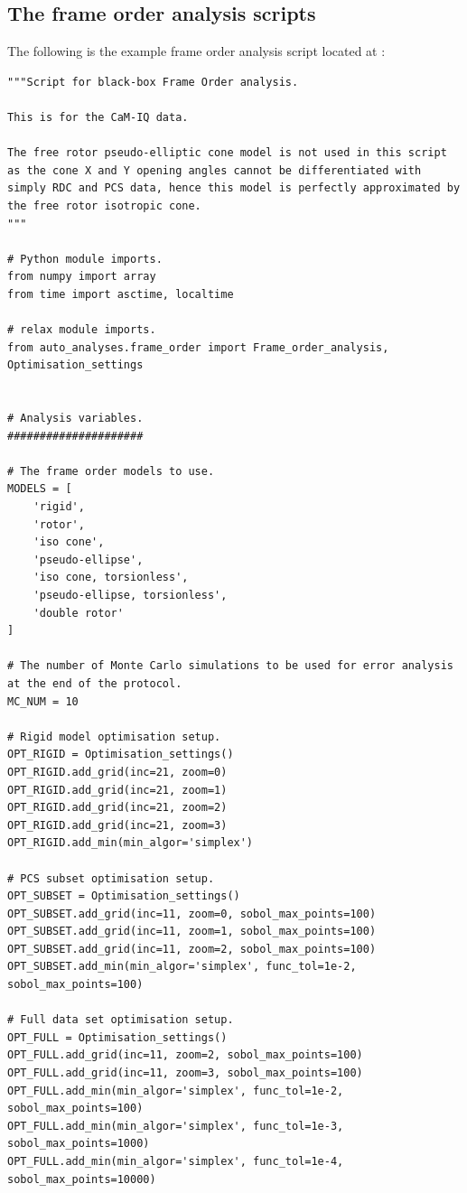 \subsection{The frame order analysis scripts}
\label{sect: frame order analysis script}

The following is the example frame order analysis script located at :

\begin{lstlisting}
"""Script for black-box Frame Order analysis.

This is for the CaM-IQ data.

The free rotor pseudo-elliptic cone model is not used in this script as the cone X and Y opening angles cannot be differentiated with simply RDC and PCS data, hence this model is perfectly approximated by the free rotor isotropic cone.
"""

# Python module imports.
from numpy import array
from time import asctime, localtime

# relax module imports.
from auto_analyses.frame_order import Frame_order_analysis, Optimisation_settings


# Analysis variables.
#####################

# The frame order models to use.
MODELS = [
    'rigid',
    'rotor',
    'iso cone',
    'pseudo-ellipse',
    'iso cone, torsionless',
    'pseudo-ellipse, torsionless',
    'double rotor'
]

# The number of Monte Carlo simulations to be used for error analysis at the end of the protocol.
MC_NUM = 10

# Rigid model optimisation setup.
OPT_RIGID = Optimisation_settings()
OPT_RIGID.add_grid(inc=21, zoom=0)
OPT_RIGID.add_grid(inc=21, zoom=1)
OPT_RIGID.add_grid(inc=21, zoom=2)
OPT_RIGID.add_grid(inc=21, zoom=3)
OPT_RIGID.add_min(min_algor='simplex')

# PCS subset optimisation setup.
OPT_SUBSET = Optimisation_settings()
OPT_SUBSET.add_grid(inc=11, zoom=0, sobol_max_points=100)
OPT_SUBSET.add_grid(inc=11, zoom=1, sobol_max_points=100)
OPT_SUBSET.add_grid(inc=11, zoom=2, sobol_max_points=100)
OPT_SUBSET.add_min(min_algor='simplex', func_tol=1e-2, sobol_max_points=100)

# Full data set optimisation setup.
OPT_FULL = Optimisation_settings()
OPT_FULL.add_grid(inc=11, zoom=2, sobol_max_points=100)
OPT_FULL.add_grid(inc=11, zoom=3, sobol_max_points=100)
OPT_FULL.add_min(min_algor='simplex', func_tol=1e-2, sobol_max_points=100)
OPT_FULL.add_min(min_algor='simplex', func_tol=1e-3, sobol_max_points=1000)
OPT_FULL.add_min(min_algor='simplex', func_tol=1e-4, sobol_max_points=10000)


\end{lstlisting}
